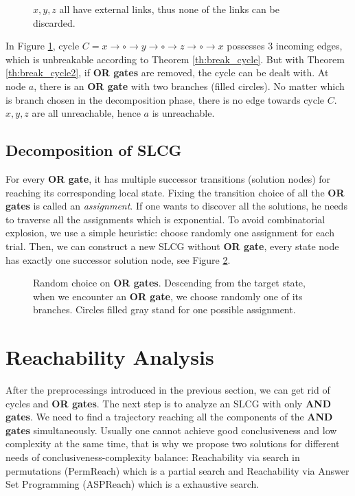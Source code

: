     \begin{figure}[ht]
        \centering
        
        \caption[Removal of cycles]{$x,y,z$ all have external links, thus none of the links can be discarded.}
        \label{cycle3}
    \end{figure}

\begin{example}\label{example:cycles}
    In Figure \ref{cycle3}, cycle $C=x\to \circ \to y \to \circ \to z\to \circ \to x$ possesses 3 incoming edges, which is unbreakable according to Theorem \ref{th:break_cycle}.
    But with Theorem \ref{th:break_cycle2}, if \textbf{OR gates} are removed, the cycle can be dealt with.
    At node $a$, there is an \textbf{OR gate} with two branches (filled circles).
    No matter which is branch chosen in the decomposition phase, there is no edge towards cycle $C$.
    $x,y,z$ are all unreachable, hence $a$ is unreachable.
\end{example}

\subsection{Decomposition of SLCG}\label{sec:decomp}

For every \textbf{OR gate}, it has multiple successor transitions (solution nodes) for reaching its corresponding local state.
Fixing the transition choice of all the \textbf{OR gates} is called an \textit{assignment}.
If one wants to discover all the solutions, he needs to traverse all the assignments which is exponential.
To avoid combinatorial explosion, we use a simple heuristic: 
choose randomly one assignment for each trial.
Then, we can construct a new SLCG without \textbf{OR gate}, every state node has exactly one successor solution node, see Figure \ref{fig:heuristics}.

\begin{figure}[ht]
    \centering
    
    \caption[Random choice on \textbf{OR gates}]{Random choice on \textbf{OR gates}. Descending from the target state, when we encounter an \textbf{OR gate}, we choose randomly one of its branches. Circles filled gray stand for one possible assignment.}
    \label{fig:heuristics}
\end{figure}

\section{Reachability Analysis}
After the preprocessings introduced in the previous section, we can get rid of cycles and \textbf{OR gates}.
The next step is to analyze an SLCG with only \textbf{AND gates}.
We need to find a trajectory reaching all the components of the \textbf{AND gates} simultaneously.
Usually one cannot achieve good conclusiveness and low complexity at the same time, that is why we propose two solutions for different needs of conclusiveness-complexity balance: Reachability via search in permutations (PermReach) which is a partial search and Reachability via Answer Set Programming (ASPReach) which is a exhaustive search.

